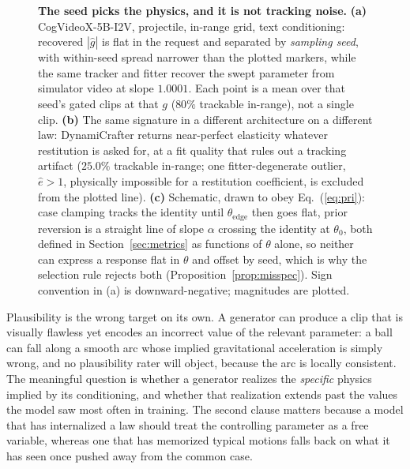 \documentclass[10pt,twocolumn,letterpaper]{article}
\begin{document}
\begin{figure}[t]
{}
\caption{\textbf{The seed picks the physics, and it is not tracking noise.}
\textbf{(a)} CogVideoX-5B-I2V, projectile, in-range grid, text conditioning:
recovered $|\hat g|$ is flat in the request and separated by \emph{sampling
seed}, with within-seed spread narrower than the plotted markers, while the
same tracker and fitter recover the swept parameter from simulator video at
slope $1.0001$. Each point is a mean over that seed's gated clips at that
$g$ ($80\%$ trackable in-range), not a single clip. \textbf{(b)} The same
signature in a different architecture on a different law: DynamiCrafter
returns near-perfect elasticity whatever restitution is asked for, at a fit
quality that rules out a tracking artifact ($25.0\%$ trackable in-range;
one fitter-degenerate outlier, $\hat e>1$, physically impossible for a
restitution coefficient, is excluded from the plotted line). \textbf{(c)}
Schematic, drawn to obey Eq.~(\ref{eq:pri}): case clamping tracks the
identity until $\theta_{\text{edge}}$ then goes flat, prior reversion is a
straight line of slope $\alpha$ crossing the identity at $\theta_0$, both
defined in Section~\ref{sec:metrics} as functions of $\theta$ alone, so
neither can express a response flat in $\theta$ and offset by seed, which
is why the selection rule rejects both (Proposition~\ref{prop:misspec}).
Sign convention in (a) is downward-negative; magnitudes are plotted.}
\label{fig:teaser}
\end{figure}

Plausibility is the wrong target on its own. A generator can produce a clip
that is visually flawless yet encodes an incorrect value of the relevant
parameter: a ball can fall along a smooth arc whose implied gravitational
acceleration is simply wrong, and no plausibility rater will object, because
the arc is locally consistent. The meaningful question is whether a generator
realizes the \emph{specific} physics implied by its conditioning, and whether
that realization extends past the values the model saw most often in
training. The second clause matters because a model that has internalized a
law should treat the controlling parameter as a free variable, whereas one
that has memorized typical motions falls back on what it has seen once pushed
away from the common case.
\end{document}
